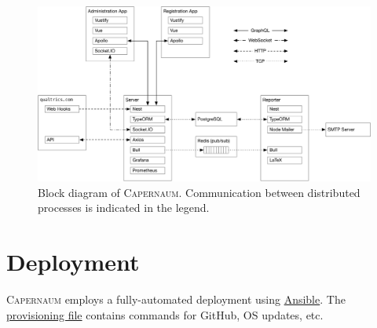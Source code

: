 \documentclass{article}
\newcommand{\caper}{\textsc{Capernaum}}
\newcommand{\ghsrc}[2]{\href{https://github.com/quantum-bits/capernaum/blob/development/#1}{#2}}
\begin{document}
\begin{figure}
  \centering
  \includegraphics[width=\textwidth]{block-diagram}
  \caption{Block diagram of \caper.
    Communication between distributed processes is indicated in the legend.}
  \label{fig:block-diagram}
\end{figure}

\section{Deployment}
\label{sec:deployment}

\caper{} employs a fully-automated deployment
using \href{https://www.ansible.com/}{Ansible}.
The \ghsrc{ansible/provision.yaml}{provisioning file} contains commands for GitHub, OS updates, etc.
\end{document}
